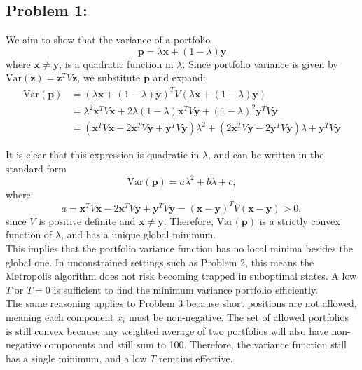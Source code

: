 \documentclass{report}
\begin{document}
\subsection*{Problem 1:}

We aim to show that the variance of a portfolio 
\[
\mathbf{p} = \lambda \mathbf{x} + (1-\lambda) \mathbf{y}
\]
where \(\mathbf{x} \neq \mathbf{y}\), is a quadratic function in \(\lambda\). Since portfolio variance is given by $\text{Var}(\mathbf{z})=\mathbf{z}^TV\mathbf{z}$, we substitute $\mathbf{p}$ and expand:
\begin{align*}
\text{Var}(\mathbf{p}) 
&= (\lambda \mathbf{x} + (1 - \lambda)\mathbf{y})^T V (\lambda \mathbf{x} + (1 - \lambda)\mathbf{y}) \\
&= \lambda^2 \mathbf{x}^T V \mathbf{x} + 2\lambda(1 - \lambda)\mathbf{x}^T V \mathbf{y} + (1 - \lambda)^2 \mathbf{y}^T V \mathbf{y} \\
&= \left( \mathbf{x}^T V \mathbf{x} - 2\mathbf{x}^T V \mathbf{y} + \mathbf{y}^T V \mathbf{y} \right)\lambda^2 
  + \left( 2\mathbf{x}^T V \mathbf{y} - 2\mathbf{y}^T V \mathbf{y} \right)\lambda 
  + \mathbf{y}^T V \mathbf{y}
\end{align*}

It is clear that this expression is quadratic in $\lambda$, and can be written in the standard form
\[
\text{Var}(\mathbf{p}) = a\lambda^2 + b\lambda+c,
\]
where 
\[
a= \mathbf{x}^T V \mathbf{x} - 2\mathbf{x}^T V \mathbf{y} + \mathbf{y}^T V \mathbf{y} = (\mathbf{x} - \mathbf{y})^TV(\mathbf{x} - \mathbf{y}) > 0,
\]
since $V$ is positive definite and $\mathbf{x} \neq \mathbf{y}$. Therefore, $\text{Var}(\mathbf{p})$ is a strictly convex function of $\lambda$, and has a unique global minimum. \\

This implies that the portfolio variance function has no local minima besides the global one. In unconstrained settings such as Problem 2, this means the Metropolis algorithm does not risk becoming trapped in suboptimal states. A low $T$ or $T = 0$ is sufficient to find the minimum variance portfolio efficiently. \\

The same reasoning applies to Problem 3 because short positions are not allowed, meaning each component $x_i$ must be non-negative. The set of allowed portfolios is still convex because any weighted average of two portfolios will also have non-negative components and still sum to 100. Therefore, the variance function still has a single minimum, and a low $T$ remains effective. \\
\end{document}
